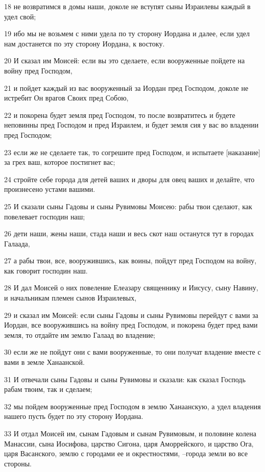 \par 18 не возвратимся в домы наши, доколе не вступят сыны Израилевы каждый в удел свой;
\par 19 ибо мы не возьмем с ними удела по ту сторону Иордана и далее, если удел нам достанется по эту сторону Иордана, к востоку.
\par 20 И сказал им Моисей: если вы это сделаете, если вооруженные пойдете на войну пред Господом,
\par 21 и пойдет каждый из вас вооруженный за Иордан пред Господом, доколе не истребит Он врагов Своих пред Собою,
\par 22 и покорена будет земля пред Господом, то после возвратитесь и будете неповинны пред Господом и пред Израилем, и будет земля сия у вас во владении пред Господом;
\par 23 если же не сделаете так, то согрешите пред Господом, и испытаете [наказание] за грех ваш, которое постигнет вас;
\par 24 стройте себе города для детей ваших и дворы для овец ваших и делайте, что произнесено устами вашими.
\par 25 И сказали сыны Гадовы и сыны Рувимовы Моисею: рабы твои сделают, как повелевает господин наш;
\par 26 дети наши, жены наши, стада наши и весь скот наш останутся тут в городах Галаада,
\par 27 а рабы твои, все, вооружившись, как воины, пойдут пред Господом на войну, как говорит господин наш.
\par 28 И дал Моисей о них повеление Елеазару священнику и Иисусу, сыну Навину, и начальникам племен сынов Израилевых,
\par 29 и сказал им Моисей: если сыны Гадовы и сыны Рувимовы перейдут с вами за Иордан, все вооружившись на войну пред Господом, и покорена будет пред вами земля, то отдайте им землю Галаад во владение;
\par 30 если же не пойдут они с вами вооруженные, то они получат владение вместе с вами в земле Ханаанской.
\par 31 И отвечали сыны Гадовы и сыны Рувимовы и сказали: как сказал Господь рабам твоим, так и сделаем;
\par 32 мы пойдем вооруженные пред Господом в землю Ханаанскую, а удел владения нашего пусть будет по эту сторону Иордана.
\par 33 И отдал Моисей им, сынам Гадовым и сынам Рувимовым, и половине колена Манассии, сына Иосифова, царство Сигона, царя Аморрейского, и царство Ога, царя Васанского, землю с городами ее и окрестностями, --города земли во все стороны.
